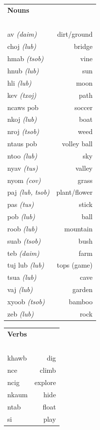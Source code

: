 \documentclass{article}
\begin{document}
\clearpage

\begin{multicols}{2}
[
\section*{}
]

\begin{tabular}{l r}
\textbf{Nouns} \\
~\\
av {\em (daim)} &dirt/ground\\
choj {\em (lub)} &bridge\\
hmab {\em (tsob)} &vine\\
hnub {\em (lub)} &sun\\
hli {\em (lub)} &moon\\
kev {\em (txoj)} &path\\
ncaws pob &soccer\\
nkoj {\em (lub)} &boat\\
nroj {\em (tsob)} &weed\\
ntaus pob &volley ball\\
ntoo {\em (lub)} &sky\\
nyav {\em (tus)} &valley\\
nyom {\em (cov)} &grass\\
paj {\em (lub, tsob)} &plant/flower\\
pas {\em (tus)} &stick\\
pob {\em (lub)} &ball\\
roob {\em (lub)} &mountain\\
suab {\em (tsob)} &bush\\
teb {\em (daim)} &farm\\
tuj lub {\em (lub)} &tops (game)\\
tsua {\em (lub)} &cave\\
vaj {\em (lub)} &garden\\
xyoob {\em (tsob)} &bamboo\\
zeb {\em (lub)} &rock\\
\end{tabular}

\begin{tabular}{l r}
\textbf{Verbs} \\
~\\
khawb &dig\\
nce &climb\\
ncig &explore\\
nkaum &hide\\
ntab &float\\
si &play\\

\end{tabular}
\end{multicols}
\end{document}
